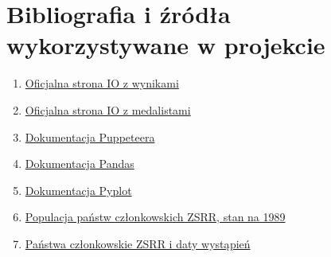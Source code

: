 \documentclass[a4paper,11pt]{article}
\begin{document}
\newpage
\section{Bibliografia i źródła wykorzystywane w projekcie}
\begin{enumerate}
    \item \href{https://olympics.com/en/olympic-games/olympic-results}{Oficjalna strona IO z wynikami}
    \item \href{https://olympics.com/en/olympic-games/beijing-2022/athletes}{Oficjalna strona IO z medalistami}
    \item \href{https://pptr.dev/}{Dokumentacja Puppeteera}
    \item \href{https://pandas.pydata.org/docs/reference/index.html}{Dokumentacja Pandas}
    \item \href{https://matplotlib.org/stable/api/pyplot_summary.html}{Dokumentacja Pyplot}
    \item \href{https://en.wikipedia.org/wiki/Demographics_of_the_Soviet_Union#Ethnic_groups}{Populacja państw członkowskich ZSRR, stan na 1989}
    \item \href{https://en.wikipedia.org/wiki/Dissolution_of_the_Soviet_Union#Chronology_of_declarations}{Państwa członkowskie ZSRR i daty wystąpień}
\end{enumerate}
\end{document}
